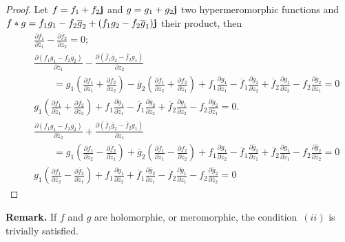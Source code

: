\documentclass[12pt]{amsart}
\theoremstyle{definition}
\begin{document}
\begin{proof}
Let $f=f_1+f_2{\bf j}$ and $g=g_1+g_2{\bf j}$ two hypermeromorphic functions and $f*g=f_1g_1-f_2\overline g_2+(f_1g_2-f_2\overline g_1){\bf j}$ their product, then
\begin{eqnarray*}
&&\frac{\partial f_1}{\partial\overline z_1}-\frac{\partial\overline f_2}{\partial z_2}=0;
\\
&&\frac{\partial
(f_1g_1-f_2\overline g_2)}{\partial\overline z_1}-\frac{\partial(\overline f_1\overline g_2-\overline f_2g_1)}{\partial z_2}\\
&&\qquad=g_1(\frac{\partial
f_1}{\partial\overline z_1}+\frac{\partial\overline f_2}{\partial z_2})-\overline g_2(\frac{\partial\overline f_1}{\partial z_2}+\frac{\partial f_2}{\partial\overline z_1})+f_1\frac{\partial g_1}{\partial\overline z_1}-\overline f_1\frac{\partial\overline g_2}{\partial z_2}+\overline f_2\frac{\partial g_1}{\partial z_2}-f_2\frac{\partial\overline g_2}{\partial\overline z_1}=0
\\
&&g_1(\frac{\partial
f_1}{\partial\overline z_1}+\frac{\partial\overline f_2}{\partial z_2})+f_1\frac{\partial g_1}{\partial\overline z_1}-\overline f_1\frac{\partial\overline g_2}{\partial z_2}+\overline f_2\frac{\partial g_1}{\partial z_2}-f_2\frac{\partial\overline g_2}{\partial\overline z_1}=0.
\\
&&\frac{\partial
(f_1g_1-f_2\overline g_2)}{\partial\overline z_2}+\frac{\partial(\overline f_1\overline g_2-\overline f_2g_1)}{\partial z_1}\\&&\qquad =g_1(\frac{\partial
f_1}{\partial\overline z_2}-\frac{\partial\overline f_2}{\partial z_1})+\overline g_2(\frac{\partial\overline f_1}{\partial z_1}-\frac{\partial f_2}{\partial\overline z_2})+f_1\frac{\partial g_1}{\partial\overline z_2}-\overline f_1\frac{\partial\overline g_2}{\partial z_1}+\overline f_2\frac{\partial g_1}{\partial z_1}-f_2\frac{\partial\overline g_2}{\partial\overline z_2}=0
\\
&&g_1(\frac{\partial
f_1}{\partial\overline z_2}-\frac{\partial\overline f_2}{\partial z_1})+f_1\frac{\partial g_1}{\partial\overline z_2}+\overline f_1\frac{\partial\overline g_2}{\partial z_1}-\overline f_2\frac{\partial g_1}{\partial z_1}-f_2\frac{\partial\overline g_2}{\partial\overline z_2}=0
\end{eqnarray*}
\end{proof}

{\bf Remark.} If $f$ and $g$ are holomorphic, or meromorphic, the condition~$(ii)$ is trivially satisfied.
\end{document}
